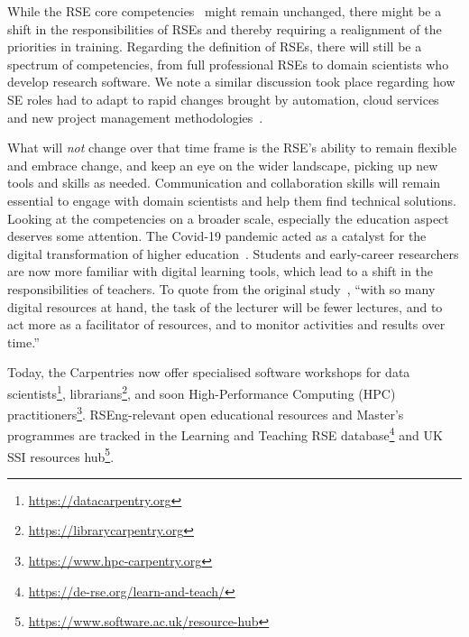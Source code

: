 \documentclass{eceasst}
\begin{document}
While the RSE core competencies~\cite{Goth2024} might remain unchanged,
there might be a shift in the responsibilities of RSEs and thereby requiring a realignment of the priorities in training.
Regarding the definition of RSEs, there will still be a spectrum of competencies,
from full professional RSEs to domain scientists who develop research software.
We note a similar discussion took place regarding how SE roles had to adapt to
rapid changes brought by automation, cloud services and new project management
methodologies~\cite{Meade2019}.

What will \emph{not} change over that time frame is the RSE's ability to remain
flexible and embrace change, and keep an eye on the wider landscape,
picking up new tools and skills as needed.
Communication and collaboration skills will remain essential to engage
with domain scientists and help them find technical solutions.\\

Looking at the competencies on a broader scale, especially the education aspect deserves some attention.
The Covid-19 pandemic acted as a catalyst for the digital transformation
of higher education~\cite{Bygstad2022}. Students and early-career researchers
are now more familiar with digital learning tools, which lead to a shift
in the responsibilities of teachers. To quote from the original study~\cite{Bygstad2022},
``with so many digital resources at hand,
the task of the lecturer will be fewer lectures,
and to act more as a facilitator of resources,
and to monitor activities and results over time.''


Today, the Carpentries now offer specialised software workshops
for data scientists\footnote{\url{https://datacarpentry.org}},
librarians\footnote{\url{https://librarycarpentry.org}},
and soon High-Performance Computing (HPC) practitioners\footnote{\url{https://www.hpc-carpentry.org}}.
RSEng-relevant open educational resources and Master's programmes are tracked
in the Learning and Teaching RSE database\footnote{\url{https://de-rse.org/learn-and-teach/}}
and UK SSI resources hub\footnote{\url{https://www.software.ac.uk/resource-hub}}.
\end{document}
